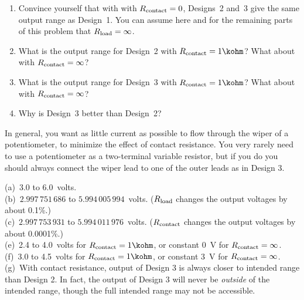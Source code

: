 \begin{Exercise}
\begin{enumerate}[resume*]
\item Convince yourself that with with $R_{\rm contact}=0$, Designs~2 and~3 give the same output range as Design~1.  You can assume here and for the remaining parts of this problem that $R_{\rm load}=\infty$.
\item What is the output range for Design~2 with $R_{\rm contact}=1\kohm$? What about with $R_{\rm contact}=\infty$?
\item What is the output range for Design~3 with $R_{\rm contact}=1\kohm$? What about with $R_{\rm contact}=\infty$?
\item Why is Design~3 better than Design~2?
\end{enumerate}
In general, you want as little current as possible to flow through the wiper of a potentiometer, to minimize the effect of contact resistance.  You very rarely need to use a potentiometer as a two-terminal variable resistor, but if you do you should always connect the wiper lead to one of the outer leads as in Design 3.
\end{Exercise}
\begin{Answer}
(a)~3.0 to 6.0~volts.  \\
(b)~$2.997\,751\,686$ to $5.994\,005\,994$~volts. ($R_{\rm load}$ changes the output voltages by about 0.1\%.)\\
(c)~$2.997\,753\,931$ to $5.994\,011\,976$~volts. ($R_{\rm contact}$ changes the output voltages by about 0.0001\%.)\\
(e)~2.4 to 4.0~volts for $R_{\rm contact} =1\kohm$, or constant 0~V for $R_{\rm contact} =\infty$.\\
(f)~3.0 to 4.5~volts for $R_{\rm contact} =1\kohm$, or constant 3~V for $R_{\rm contact} =\infty$.\\
(g)~With contact resistance, output of Design 3 is always closer to intended range than Design 2.  In fact, the output of Design 3 will never be \textit{outside} of the intended range, though the full intended range may not be accessible.
\end{Answer}

